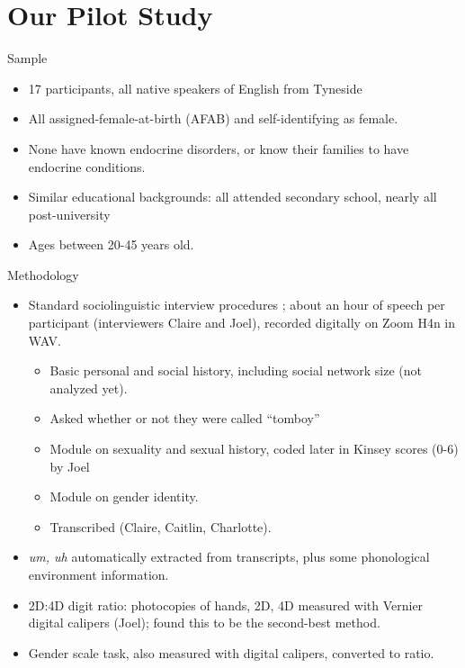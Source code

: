 \documentclass[hyperref={pdfpagelabels=false}]{beamer}
\begin{document}
\section{Our Pilot Study}

\begin{frame}{Sample}
\begin{itemize}
	\item 17 participants, all native speakers of English from Tyneside
	\item All assigned-female-at-birth (AFAB) and self-identifying as female.
	\item None have known endocrine disorders, or know their families to have endocrine conditions.
	\item Similar educational backgrounds: all attended secondary school, nearly all post-university
	\item Ages between 20-45 years old.
	
\end{itemize}
\end{frame}

\begin{frame}{Methodology}
\begin{itemize}
	\item Standard sociolinguistic interview procedures \citep{tagliamonte2006}; about an hour of speech per participant (interviewers Claire and Joel), recorded digitally on Zoom H4n in WAV.
		\begin{itemize}
			\item Basic personal and social history, including social network size (not analyzed yet).
			\item Asked whether or not they were called ``tomboy''
			\item Module on sexuality and sexual history, coded later in Kinsey scores (0-6) by Joel
			\item Module on gender identity.
			\item Transcribed (Claire, Caitlin, Charlotte).
		\end{itemize}
	\item \textsl{um, uh} automatically extracted from transcripts, plus some phonological environment information.
	\item 2D:4D digit ratio: photocopies of hands, 2D, 4D measured with Vernier digital calipers (Joel); \citet{allawayetal2009} found this to be the second-best method.
	\item Gender scale task, also measured with digital calipers, converted to ratio.
\end{itemize}
\end{frame}
\end{document}
